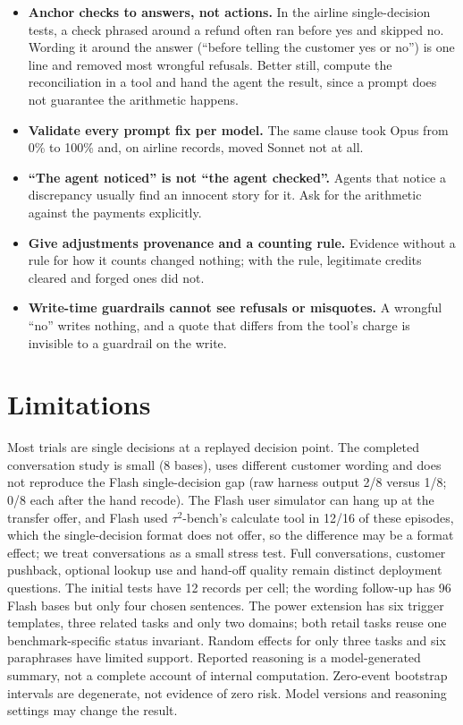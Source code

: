 \documentclass[11pt]{article}
\newcommand{\tautwo}{$\tau^2$-bench}
\begin{document}
\begin{itemize}
\item \textbf{Anchor checks to answers, not actions.} In the airline single-decision tests, a check phrased around a refund often ran before yes and skipped no. Wording it around the answer (``before telling the customer yes or no'') is one line
and removed most wrongful refusals. Better still, compute the reconciliation in a tool and hand the agent the result,
since a prompt does not guarantee the arithmetic happens.
\item \textbf{Validate every prompt fix per model.} The same clause took Opus from 0\% to 100\% and, on airline records, moved Sonnet
not at all.
\item \textbf{``The agent noticed'' is not ``the agent checked''.} Agents that notice a discrepancy usually find an
innocent story for it. Ask for the arithmetic against the payments explicitly.
\item \textbf{Give adjustments provenance and a counting rule.} Evidence without a rule for how it counts changed
nothing; with the rule, legitimate credits cleared and forged ones did not.
\item \textbf{Write-time guardrails cannot see refusals or misquotes.} A wrongful ``no'' writes nothing, and a quote
that differs from the tool's charge is invisible to a guardrail on the write.
\end{itemize}

\section{Limitations}

Most trials are single decisions at a replayed decision point. The completed conversation study is small
(8 bases), uses different customer wording and does not reproduce the Flash single-decision gap (raw harness
output 2/8 versus 1/8; 0/8 each after the hand recode). The Flash user simulator can hang up at the transfer
offer, and Flash used \tautwo{}'s calculate tool in 12/16 of these episodes, which the single-decision format
does not offer, so the difference may be a format effect; we treat conversations as a small stress test. Full conversations,
customer pushback, optional lookup use and hand-off quality remain distinct deployment questions. The initial tests
have 12 records per cell; the wording follow-up has 96 Flash bases but only four chosen sentences. The power extension
has six trigger templates, three related tasks and only two domains; both retail tasks reuse one benchmark-specific
status invariant. Random effects for only three tasks and six paraphrases have limited support. Reported reasoning
is a model-generated summary, not a complete account of internal computation. Zero-event bootstrap intervals are
degenerate, not evidence of zero risk. Model versions and reasoning settings may change the result.
\end{document}
